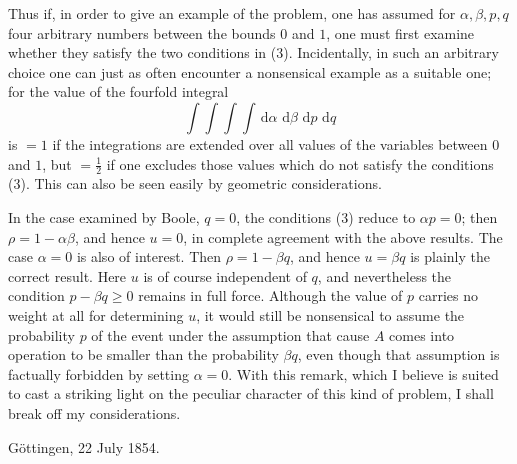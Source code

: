 \documentclass[11pt]{article}
\newcommand{\dd}{\,\mathrm d}
\newcommand{\datedline}[1]{\begin{flushright}#1\end{flushright}}
\begin{document}
Thus if, in order to give an example of the problem, one has assumed for $\alpha,\beta,p,q$ four arbitrary numbers between the bounds $0$ and $1$, one must first examine whether they satisfy the two conditions in (3). Incidentally, in such an arbitrary choice one can just as often encounter a nonsensical example as a suitable one; for the value of the fourfold integral
\[
\int\!\int\!\int\!\int \dd\alpha\,\dd\beta\,\dd p\,\dd q
\]
is $=1$ if the integrations are extended over all values of the variables between $0$ and $1$, but $=\frac12$ if one excludes those values which do not satisfy the conditions (3). This can also be seen easily by geometric considerations.

In the case examined by Boole, $q=0$, the conditions (3) reduce to $\alpha p=0$; then $\rho=1-\alpha\beta$, and hence $u=0$, in complete agreement with the above results. The case $\alpha=0$ is also of interest. Then $\rho=1-\beta q$, and hence $u=\beta q$ is plainly the correct result. Here $u$ is of course independent of $q$, and nevertheless the condition $p-\beta q\ge0$ remains in full force. Although the value of $p$ carries no weight at all for determining $u$, it would still be nonsensical to assume the probability $p$ of the event under the assumption that cause $A$ comes into operation to be smaller than the probability $\beta q$, even though that assumption is factually forbidden by setting $\alpha=0$. With this remark, which I believe is suited to cast a striking light on the peculiar character of this kind of problem, I shall break off my considerations.

\datedline{Göttingen, 22 July 1854.}
\end{document}
